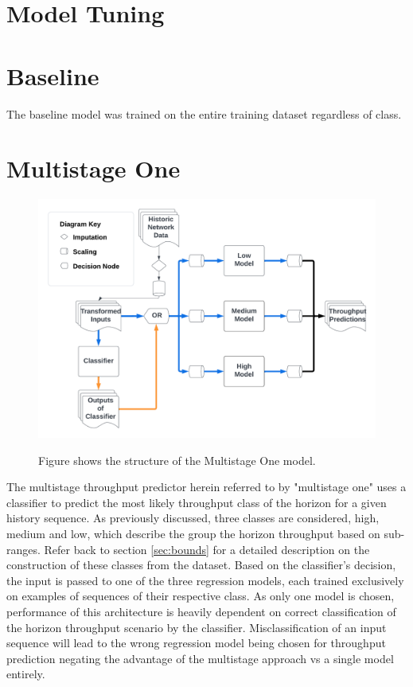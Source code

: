 \section{Model Tuning}
\label{sec:model_tuning}



\section{Baseline}
The baseline model was trained on the entire training dataset regardless of class.

\section{Multistage One}
\begin{figure}[h]
\centering
\includegraphics[scale=0.15]{Multistage One.png}
\label{fig:multistage_one}
\caption{Figure shows the structure of the Multistage One model.}
\end{figure}

The multistage throughput predictor herein referred to by "multistage one" uses a classifier to predict the most likely throughput class of the horizon for a given history sequence. As previously discussed, three classes are considered, high, medium and low, which describe the group the horizon throughput based on sub-ranges. Refer back to section \ref{sec:bounds} for a detailed description on the construction of these classes from the dataset. Based on the classifier's decision, the input is passed to one of the three regression models, each trained exclusively on examples of sequences of their respective class. As only one model is chosen, performance of this architecture is heavily dependent on correct classification of the horizon throughput scenario by the classifier. Misclassification of an input sequence will lead to the wrong regression model being chosen for throughput prediction negating the advantage of the multistage approach vs a single model entirely.

